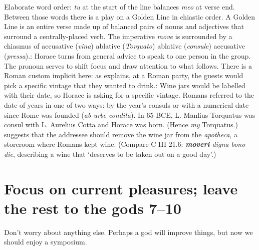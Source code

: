 Elaborate word order: \textit{tu} at the start of the line balances \textit{meo} at verse end. Between those words there is a play on a Golden Line in chiastic order.  A Golden Line is an entire verse made up of balanced pairs of nouns and adjectives that surround a centrally-placed verb.  The imperative \textit{move} is surrounded by a chiasmus of accusative (\textit{vina}) ablative (\textit{Torquato}) ablative (\textit{consule}) accusative (\textit{pressa}).\indent{}: Horace turns from general advice to speak to one person in the group.  The pronoun serves to shift focus and draw attention to what follows.  There is a Roman custom implicit here: as \citet[136]{kilpatrick1970} explains, at a Roman party, the guests would pick a specific vintage that they wanted to drink.\indent{}: Wine jars would be labelled with their date, so Horace is asking for a specific vintage.  Romans referred to the date of years in one of two ways: by the year's consuls or with a numerical date since Rome was founded (\textit{ab urbe condita}).  In 65 BCE, L. Manlius Torquatus was consul with L. Aurelius Cotta and Horace was born.  (Hence \textit{my} Torquatus.)\indent{} suggests that the addressee should remove the wine jar from the \textit{apothēca}, a storeroom where Romans kept wine.  (Compare C III 21.6: \textit{\textbf{moveri} digna bono die}, describing a wine that `deserves to be taken out on a good day'.)


\section*{Focus on current pleasures; leave the rest to the gods 7--10}

Don't worry about anything else. Perhaps a god will improve things, but now we should enjoy a symposium.


